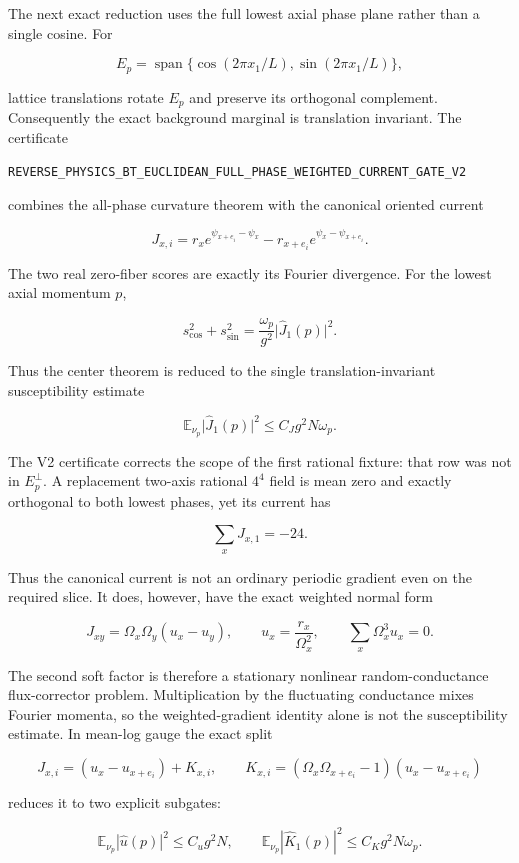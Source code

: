 \documentclass[11pt]{article}
\theoremstyle{definition}
\theoremstyle{remark}
\newcommand{\cert}[1]{\nolinkurl{#1}}
\begin{document}
The next exact reduction uses the full lowest axial phase plane rather than a
single cosine.  For

\[
 E_p=\operatorname{span}\{\cos(2\pi x_1/L),\sin(2\pi x_1/L)\},
\]

lattice translations rotate \(E_p\) and preserve its orthogonal complement.
Consequently the exact background marginal is translation invariant.  The
certificate

\cert{REVERSE_PHYSICS_BT_EUCLIDEAN_FULL_PHASE_WEIGHTED_CURRENT_GATE_V2}

combines the all-phase curvature theorem with the canonical oriented current

\[
 J_{x,i}=r_x e^{\psi_{x+e_i}-\psi_x}
          -r_{x+e_i}e^{\psi_x-\psi_{x+e_i}}.
\]

The two real zero-fiber scores are exactly its Fourier divergence.  For the
lowest axial momentum \(p\),

\[
 s_{\cos}^2+s_{\sin}^2
 =\frac{\omega_p}{g^2}\lvert\widehat J_1(p)\rvert^2.
\]

Thus the center theorem is reduced to the single translation-invariant
susceptibility estimate

\[
 \mathbb E_{\nu_p}\lvert\widehat J_1(p)\rvert^2
 \leq C_J g^2N\omega_p.
\]

The V2 certificate corrects the scope of the first rational fixture: that row
was not in \(E_p^\perp\).  A replacement two-axis rational \(4^4\) field is
mean zero and exactly orthogonal to both lowest phases, yet its current has

\[
 \sum_xJ_{x,1}=-24.
\]

Thus the canonical current is not an ordinary periodic gradient even on the
required slice.  It does, however, have the exact weighted normal form

\[
 J_{xy}=\Omega_x\Omega_y(u_x-u_y),\qquad
 u_x=\frac{r_x}{\Omega_x^2},\qquad
 \sum_x\Omega_x^3u_x=0.
\]

The second soft factor is therefore a stationary nonlinear
random-conductance flux-corrector problem.  Multiplication by the fluctuating
conductance mixes Fourier momenta, so the weighted-gradient identity alone is
not the susceptibility estimate.  In mean-log gauge the exact split

\[
 J_{x,i}=(u_x-u_{x+e_i})+K_{x,i},\qquad
 K_{x,i}=(\Omega_x\Omega_{x+e_i}-1)(u_x-u_{x+e_i})
\]

reduces it to two explicit subgates:

\[
 \mathbb E_{\nu_p}|\widehat u(p)|^2\leq C_u g^2N,
 \qquad
 \mathbb E_{\nu_p}|\widehat K_1(p)|^2
 \leq C_Kg^2N\omega_p.
\]
\end{document}
